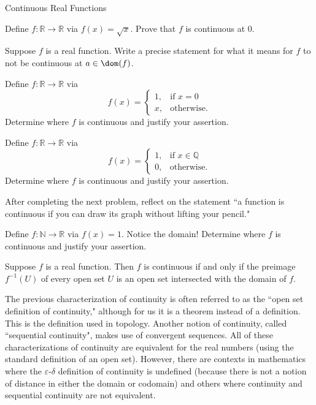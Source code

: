 \begin{section}{Continuous Real Functions}
\begin{problem}
Define $f:\mathbb{R}\to\mathbb{R}$ via $f(x)=\sqrt{x}$. Prove that $f$ is continuous at 0.
\end{problem}

\begin{problem}
Suppose $f$ is a real function. Write a precise statement for what it means for $f$ to not be continuous at $a\in\dom(f)$.
\end{problem}

\begin{problem}
Define $f:\mathbb{R}\to\mathbb{R}$ via 
\[
f(x)=\begin{cases}
1, & \text{if }x=0\\
x, & \text{otherwise}.
\end{cases}
\]
Determine where $f$ is continuous and justify your assertion.
\end{problem}

\begin{problem}
Define $f:\mathbb{R}\to\mathbb{R}$ via 
\[
f(x)=\begin{cases}
1, & \text{if }x\in \mathbb{Q}\\
0, & \text{otherwise}.
\end{cases}
\]
Determine where $f$ is continuous and justify your assertion.
\end{problem}

After completing the next problem, reflect on the statement ``a function is continuous if you can draw its graph without lifting your pencil."

\begin{problem}
Define $f:\mathbb{N}\to\mathbb{R}$ via $f(x)=1$. Notice the domain! Determine where $f$ is continuous and justify your assertion.
\end{problem}

\begin{theorem}\label{thm:inverse images open sets}
Suppose $f$ is a real function. Then $f$ is continuous if and only if the preimage $f^{-1}(U)$ of every open set $U$ is an open set intersected with the domain of $f$.
\end{theorem}

The previous characterization of continuity is often referred to as the ``open set definition of continuity," although for us it is a theorem instead of a definition. This is the definition used in topology. Another notion of continuity, called ``sequential continuity", makes use of convergent sequences.  All of these characterizations of continuity are equivalent for the real numbers (using the standard definition of an open set). However, there are contexts in mathematics where the $\varepsilon$-$\delta$ definition of continuity is undefined (because there is not a notion of distance in either the domain or codomain) and others where continuity and sequential continuity are not equivalent.


\end{section}

